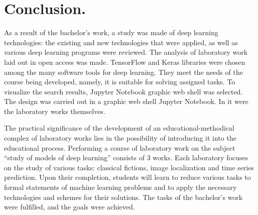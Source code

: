 \section{Conclusion.}

As a result of the bachelor's work, a study was made of deep learning technologies: the existing and new technologies that were applied, as well as various deep learning programs were reviewed. The analysis of laboratory work laid out in open access was made.
TensorFlow and Keras libraries were chosen among the many software tools for deep learning. They meet the needs of the course being developed, namely, it is suitable for solving assigned tasks.
To visualize the search results, Jupyter Notebook graphic web shell was selected. The design was carried out in a graphic web shell Jupyter Notebook. In it were the laboratory works themselves.

The practical significance of the development of an educational-methodical complex of laboratory works lies in the possibility of introducing it into the educational process.
Performing a course of laboratory work on the subject “study of models of deep learning” consists of 3 works. Each laboratory focuses on the study of various tasks: classical fictions, image localization and time series prediction. Upon their completion, students will learn to reduce various tasks to formal statements of machine learning problems and to apply the necessary technologies and schemes for their solutions.
The tasks of the bachelor's work were fulfilled, and the goals were achieved.